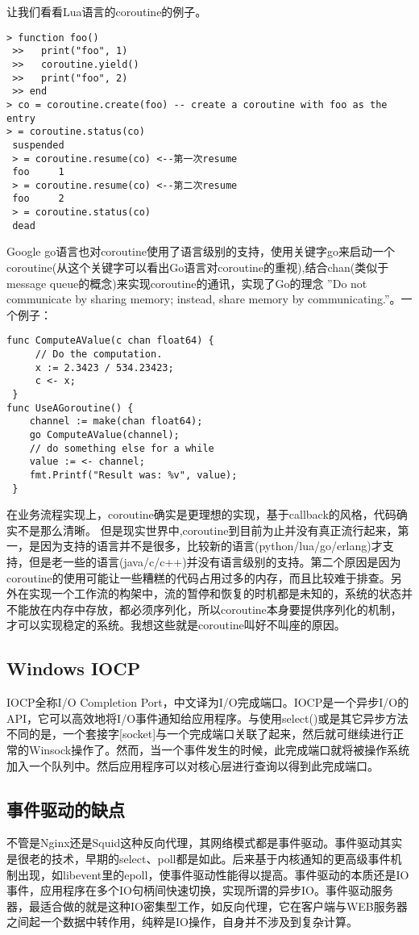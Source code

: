 让我们看看Lua语言的coroutine的例子。
\begin{verbatim}
> function foo()
 >>   print("foo", 1)
 >>   coroutine.yield()
 >>   print("foo", 2)
 >> end
> co = coroutine.create(foo) -- create a coroutine with foo as the entry
> = coroutine.status(co)
 suspended
 > = coroutine.resume(co) <--第一次resume
 foo     1
 > = coroutine.resume(co) <--第二次resume
 foo     2
 > = coroutine.status(co)
 dead
\end{verbatim}
Google go语言也对coroutine使用了语言级别的支持，使用关键字go来启动一个coroutine(从这个关键字可以看出Go语言对coroutine的重视),结合chan(类似于message queue的概念)来实现coroutine的通讯，实现了Go的理念 ”Do not communicate by sharing memory; instead, share memory by communicating.”。一个例子：
\begin{verbatim}
func ComputeAValue(c chan float64) {
     // Do the computation.
     x := 2.3423 / 534.23423;
     c <- x;
 }
func UseAGoroutine() {
    channel := make(chan float64);
    go ComputeAValue(channel);
    // do something else for a while
    value := <- channel;
    fmt.Printf("Result was: %v", value);
 }
\end{verbatim}


在业务流程实现上，coroutine确实是更理想的实现，基于callback的风格，代码确实不是那么清晰。
但是现实世界中,coroutine到目前为止并没有真正流行起来，第一，是因为支持的语言并不是很多，比较新的语言(python/lua/go/erlang)才支持，但是老一些的语言(java/c/c++)并没有语言级别的支持。第二个原因是因为coroutine的使用可能让一些糟糕的代码占用过多的内存，而且比较难于排查。另外在实现一个工作流的构架中，流的暂停和恢复的时机都是未知的，系统的状态并不能放在内存中存放，都必须序列化，所以coroutine本身要提供序列化的机制，才可以实现稳定的系统。我想这些就是coroutine叫好不叫座的原因。

\subsection{Windows IOCP}
IOCP全称I/O Completion Port，中文译为I/O完成端口。IOCP是一个异步I/O的API，它可以高效地将I/O事件通知给应用程序。与使用select()或是其它异步方法不同的是，一个套接字[socket]与一个完成端口关联了起来，然后就可继续进行正常的Winsock操作了。然而，当一个事件发生的时候，此完成端口就将被操作系统加入一个队列中。然后应用程序可以对核心层进行查询以得到此完成端口。

\subsection{事件驱动的缺点}
不管是Nginx还是Squid这种反向代理，其网络模式都是事件驱动。事件驱动其实是很老的技术，早期的select、poll都是如此。后来基于内核通知的更高级事件机制出现，如libevent里的epoll，使事件驱动性能得以提高。事件驱动的本质还是IO事件，应用程序在多个IO句柄间快速切换，实现所谓的异步IO。事件驱动服务器，最适合做的就是这种IO密集型工作，如反向代理，它在客户端与WEB服务器之间起一个数据中转作用，纯粹是IO操作，自身并不涉及到复杂计算。

